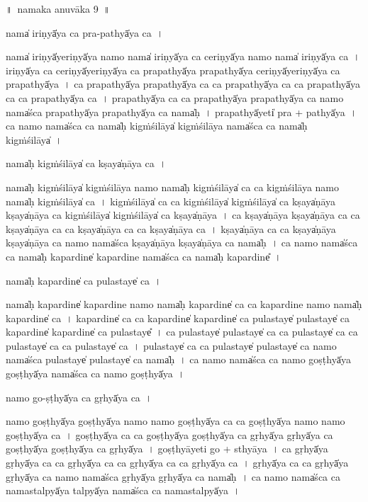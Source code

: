 \documentclass[parskip, DIV=14]{scrartcl}
\begin{document}
{%

\newpage
\LARGE
॥~namaka anuvāka 9~॥ 
\Large

nama̍ iri॒ṇyā̍ya ca pra-pa॒thyā̍ya ca॒~।

nama̍ iri॒ṇyā̍yeri॒ṇyā̍ya॒ namo॒ nama̍ iri॒ṇyā̍ya ca ceri॒ṇyā̍ya॒ namo॒ nama̍ iri॒ṇyā̍ya ca~।
i॒ri॒ṇyā̍ya ca ceri॒ṇyā̍yeri॒ṇyā̍ya ca prapa॒thyā̍ya prapa॒thyā̍ya ceri॒ṇyā̍yeri॒ṇyā̍ya ca prapa॒thyā̍ya~।
ca॒ pra॒pa॒thyā̍ya prapa॒thyā̍ya ca ca prapa॒thyā̍ya ca ca prapa॒thyā̍ya ca ca prapa॒thyā̍ya ca~।
pra॒pa॒thyā̍ya ca ca prapa॒thyā̍ya prapa॒thyā̍ya ca॒ namo॒ nama̍śca prapa॒thyā̍ya prapa॒thyā̍ya ca॒ nama̍ḥ~।
pra॒pa॒thyā̍yeti̍ pra + pa॒thyā̍ya~।
ca॒ namo॒ nama̍śca ca॒ nama̍ḥ kigṁśi॒lāya̍ kigṁśi॒lāya॒ nama̍śca ca॒ nama̍ḥ kigṁśi॒lāya̍~।

nama̍ḥ kigṁśi॒lāya̍ ca॒ kṣaya̍ṇāya ca॒~।

nama̍ḥ kigṁśi॒lāya̍ kigṁśi॒lāya॒ namo॒ nama̍ḥ kigṁśi॒lāya̍ ca ca kigṁśi॒lāya॒ namo॒ nama̍ḥ kigṁśi॒lāya̍ ca~।
ki॒gṁ॒śi॒lāya̍ ca ca kigṁśi॒lāya̍ kigṁśi॒lāya̍ ca॒ kṣaya̍ṇāya॒ kṣaya̍ṇāya ca kigṁśi॒lāya̍ kigṁśi॒lāya̍ ca॒ kṣaya̍ṇāya~।
ca॒ kṣaya̍ṇāya॒ kṣaya̍ṇāya ca ca॒ kṣaya̍ṇāya ca ca॒ kṣaya̍ṇāya ca ca॒ kṣaya̍ṇāya ca~।
kṣaya̍ṇāya ca ca॒ kṣaya̍ṇāya॒ kṣaya̍ṇāya ca॒ namo॒ nama̍śca॒ kṣaya̍ṇāya॒ kṣaya̍ṇāya ca॒ nama̍ḥ~।
ca॒ namo॒ nama̍śca ca॒ nama̍ḥ kapa॒rdine̍ kapa॒rdine॒ nama̍śca ca॒ nama̍ḥ kapa॒rdine̎~।

nama̍ḥ kapa॒rdine̍ ca pula॒staye̍ ca॒~।

nama̍ḥ kapa॒rdine̍ kapa॒rdine॒ namo॒ nama̍ḥ kapa॒rdine̍ ca ca kapa॒rdine॒ namo॒ nama̍ḥ kapa॒rdine̍ ca~।
ka॒pa॒rdine̍ ca ca kapa॒rdine̍ kapa॒rdine̍ ca pula॒staye̍ pula॒staye̍ ca kapa॒rdine̍ kapa॒rdine̍ ca pula॒staye̎~।
ca॒ pu॒la॒staye̍ pula॒staye̍ ca  ca  pula॒staye̍ ca ca pula॒staye̍ ca  ca  pula॒staye̍ ca~।
pu॒la॒staye̍ ca ca pula॒staye̍ pula॒staye̍ ca॒ namo॒ nama̍śca pula॒staye̍ pula॒staye̍ ca॒ nama̍ḥ~।
ca॒ namo॒ nama̍śca ca॒ namo॒ goṣṭhyā̍ya॒ goṣṭhyā̍ya॒ nama̍śca ca॒ namo॒ goṣṭhyā̍ya~।

namo॒ go-ṣṭhyā̍ya ca॒ gṛhyā̍ya ca॒~।

namo॒ goṣṭhyā̍ya॒ goṣṭhyā̍ya॒ namo॒ namo॒ goṣṭhyā̍ya ca ca॒ goṣṭhyā̍ya॒ namo॒ namo॒ goṣṭhyā̍ya ca~।
goṣṭhyā̍ya ca ca॒ goṣṭhyā̍ya॒  goṣṭhyā̍ya ca॒ gṛhyā̍ya॒ gṛhyā̍ya ca॒ goṣṭhyā̍ya॒  goṣṭhyā̍ya ca॒ gṛhyā̍ya~।
goṣṭhyā॒yeti॒ go + sthyā॒ya॒~।
ca॒ gṛhyā̍ya॒ gṛhyā̍ya ca ca॒ gṛhyā̍ya ca ca॒ gṛhyā̍ya ca ca॒ gṛhyā̍ya ca~।
gṛhyā̍ya ca ca॒  gṛhyā̍ya॒ gṛhyā̍ya ca॒ namo॒ nama̍śca॒  gṛhyā̍ya॒ gṛhyā̍ya ca॒ nama̍ḥ~।
ca॒ namo॒ nama̍śca ca॒ nama॒stalpyā̍ya॒ talpyā̍ya॒ nama̍śca ca॒ nama॒stalpyā̍ya~।

}
\end{document}
